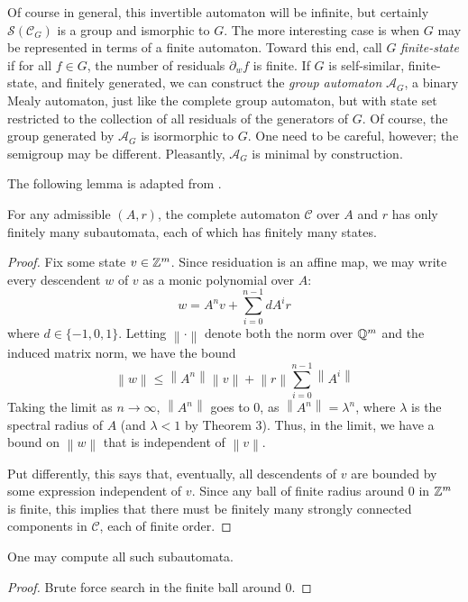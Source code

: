 \documentclass[11pt, titlepage]{article}
\newcommand{\norm}[1]{\left\lVert#1\right\rVert}
\begin{document}
Of course in general,
this invertible automaton will be infinite, but certainly
$\mathcal{S}(\mathcal{C}_G)$ is a group and ismorphic to $G$. The more
interesting case is when $G$ may be represented in terms of a finite
automaton. Toward this end, call $G$ \emph{finite-state} if for all
$f \in G$, the number of residuals $\partial_w f$ is finite. If $G$ is
self-similar, finite-state, and finitely generated, we can construct
the \emph{group automaton} $\mathcal{A}_G$, a binary Mealy automaton,
just like the complete group automaton, but with state set restricted
to the collection of all residuals of the generators of $G$. Of
course, the group generated by $\mathcal{A}_G$ is isormorphic to
$G$. One need to be careful, however; the semigroup may be
different. Pleasantly, $\mathcal{A}_G$ is minimal by construction.

The following lemma is adapted from \cite{okano:thesis}. 

\begin{lemma}
  For any admissible $(A, r)$, the complete automaton $\mathcal{C}$
  over $A$ and $r$ has only finitely many subautomata, each of which
  has finitely many states.
\end{lemma}
\begin{proof}
  Fix some state $v \in \mathbb{Z}^m$. Since residuation is an affine map, we
  may write every descendent $w$ of $v$ as a monic polynomial over $A$:
  \[
    w = A^nv + \sum_{i = 0}^{n-1}d A^i r
  \]
  where $d \in \{-1, 0, 1\}$. Letting $\norm{\cdot}$ denote both the
  norm over $\mathbb{Q}^m$ and the induced matrix norm, we have the bound
  \[
    \norm{w} \leq \norm{A^n}\norm{v} + \norm{r} \sum_{i=0}^{n-1} \norm{A^i}
  \]
  Taking the limit as $n\rightarrow\infty$, $\norm{A^n}$ goes to 0, as
  $\norm{A^n} = \lambda^n$, where $\lambda$ is the spectral radius of
  $A$ (and $\lambda < 1$ by Theorem 3). Thus, in the limit, we have a
  bound on $\norm{w}$ that is independent of $\norm{v}$.

  Put differently, this says that, eventually, all descendents of $v$
  are bounded by some expression independent of $v$. Since any ball of
  finite radius around 0 in $\mathbb{Z}^m$ is finite, this implies that there
  must be finitely many strongly connected components in
  $\mathcal{C}$, each of finite order.
\end{proof}

\begin{lemma}
  One may compute all such subautomata.
\end{lemma}
\begin{proof}
  Brute force search in the finite ball around 0.
\end{proof}
\end{document}

